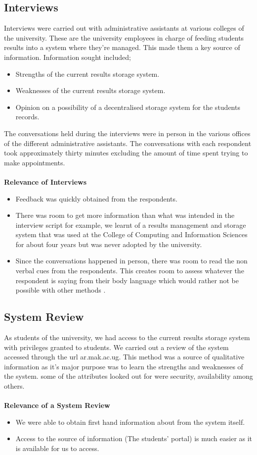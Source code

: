 \subsection{Interviews}
Interviews were carried out with administrative assistants at various colleges of the university. These are the university employees in charge of feeding students results into a system where they're managed. This made them a key source of information. Information sought included;
\begin{itemize}
\item Strengths of the current results storage system.
\item Weaknesses of the current results storage system.
\item Opinion on a possibility of a decentralised storage system for the students records.
\end{itemize}
The conversations held during the interviews were in person in the various offices of the different administrative assistants. The conversations with each respondent took approximately thirty minutes excluding the amount of time spent trying to make appointments.\\~\\
\textbf{Relevance of Interviews}
\begin{itemize}
\item Feedback was quickly obtained from the respondents.
\item There was room to get more information than what was intended in the interview script for example, we learnt of a results management and storage system that was used at the College of Computing and Information Sciences for about four years but was never adopted by the university.
\item Since the conversations happened in person, there was room to read the non verbal cues from the respondents. This creates room to assess whatever the respondent is saying from their body language which would rather not be possible with other methods \cite{17}.
\end{itemize}

\subsection{System Review}
As students of the university, we had access to the current results storage system with privileges granted to students. We carried out a review of the system accessed through the url ar.mak.ac.ug. This method was a source of qualitative information as it's major purpose was to learn the strengths and weaknesses of the system. some of the attributes looked out for were security, availability among others.\\~\\
\textbf{Relevance of a System Review}
\begin{itemize}
\item We were able to obtain first hand information about from the system itself.
\item Access to the source of information (The students' portal) is much easier as it is available for us to access.
\end{itemize}


